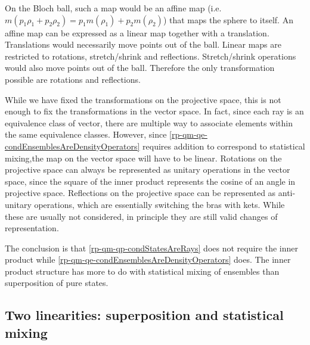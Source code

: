 On the Bloch ball, such a map would be an affine map (i.e. $m(p_1\rho_1 + p_2 \rho_2) = p_1 m(\rho_1) + p_2 m(\rho_2) $) that maps the sphere to itself. An affine map can be expressed as a linear map together with a translation. Translations would necessarily move points out of the ball. Linear maps are restricted to rotations, stretch/shrink and reflections. Stretch/shrink operations would also move points out of the ball. Therefore the only transformation possible are rotations and reflections.

While we have fixed the transformations on the projective space, this is not enough to fix the transformations in the vector space. In fact, since each ray is an equivalence class of vector, there are multiple way to associate elements within the same equivalence classes. However, since \ref{rp-qm-qe-condEnsemblesAreDensityOperators} requires addition to correspond to statistical mixing,the map on the vector space will have to be linear. Rotations on the projective space can always be represented as unitary operations in the vector space, since the square of the inner product represents the cosine of an angle in projective space. Reflections on the projective space can be represented as anti-unitary operations, which are essentially switching the bras with kets. While these are usually not considered, in principle they are still valid changes of representation.

The conclusion is that \ref{rp-qm-qp-condStatesAreRays} does not require the inner product while \ref{rp-qm-qe-condEnsemblesAreDensityOperators} does. The inner product structure has more to do with statistical mixing of ensembles than superposition of pure states.

\subsection{Two linearities: superposition and statistical mixing}

